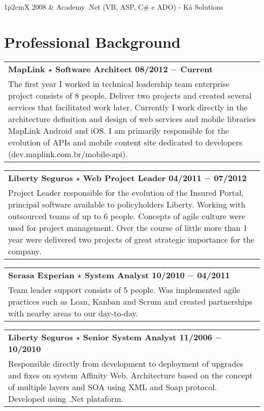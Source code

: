 \documentclass[a4paper, oneside, final]{scrartcl}
\newcommand{\vspc}{\vspace{0.15cm}} %
\begin{document}
\begin{center}
\begin{tabularx}{1\linewidth}{p{2cm}X}
2008       & Academy .Net (VB, ASP, C\# e ADO) - Ká Solutions 
\end{tabularx}


\section{Professional Background}
\begin{tabularx}{1\linewidth}{X}
{\bf MapLink $\star$ Software Architect \hfill 08/2012 $-$ Current} \\
The first year I worked in technical leadership team enterprise project consists of 8 people. Deliver two projects and created several services that facilitated work later. Currently I work directly in the architecture definition and design of web services and mobile libraries MapLink Android and iOS. I am primarily responsible for the evolution of APIs and mobile content site dedicated to developers (dev.maplink.com.br/mobile-api). \vspc\\
\end{tabularx}

\begin{tabularx}{1\linewidth}{X}
{\bf Liberty Seguros $\star$ Web Project Leader \hfill 04/2011 $-$ 07/2012} \\
Project Leader responsible for the evolution of the Insured Portal, principal software available to policyholders Liberty. Working with outsourced teams of up to 6 people. Concepts of agile culture were used for project management. Over the course of little more than 1 year were delivered two projects of great strategic importance for the company. \vspc\\
\end{tabularx}

\begin{tabularx}{1\linewidth}{X}
{\bf Serasa Experian $\star$  System Analyst \hfill 10/2010 $-$ 04/2011} \\
Team leader support consists of 5 people. Was implemented agile practices such as Lean, Kanban and Scrum and created partnerships with nearby areas to our day-to-day.\vspc\\
\end{tabularx}

\begin{tabularx}{1\linewidth}{X}
{\bf Liberty Seguros $\star$ Senior System Analyst \hfill 11/2006 $-$ 10/2010} \\
Responsible directly from development to deployment of upgrades and fixes on system Affinity Web. Architecture based on the concept of multiple layers and SOA using XML and Soap protocol. Developed using .Net plataform.\vspc\\
\end{tabularx}


\end{center}
\end{document}
